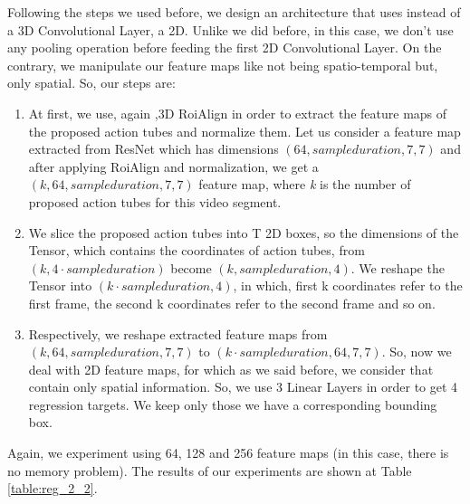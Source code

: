 \documentclass{report}
\begin{document}
Following the steps we used before, we design an architecture that uses instead of a 3D Convolutional Layer, a 2D. Unlike we did before, in this case, we don't
use any pooling operation before feeding the first 2D Convolutional Layer. On the contrary, we manipulate our feature maps like not being spatio-temporal but,
only spatial. So, our steps are:
\begin{enumerate}
\item At first, we use, again ,3D RoiAlign in order to extract the feature maps of the proposed action tubes and normalize them. Let us consider a feature map
  extracted from ResNet which has dimensions $(64,sample duration,7,7)$ and after applying RoiAlign and normalization, we get a $(k,64,sample duration,7,7)$ feature map,
  where \textit{k} is the number of proposed  action tubes for this video segment.
\item We slice the proposed action tubes into T 2D boxes, so the dimensions of the Tensor, which contains the coordinates of action tubes, from $(k,4\cdot sample duration)$
  become $(k,sample duration, 4)$. We reshape the Tensor into $(k\cdot sample duration, 4)$, in which, first k coordinates refer to the first frame, the
  second k coordinates refer to the second frame and so on.
\item Respectively, we reshape extracted feature maps from $(k, 64, sample duration, 7, 7)$ to $(k\cdot sample duration, 64, 7, 7)$. So, now we deal with 2D feature maps, for which as we said before,
  we consider that contain only spatial information. So, we use 3 Linear Layers in order to get 4 regression targets. We keep only those we have a corresponding bounding
  box.
\end{enumerate}

Again, we experiment using 64, 128 and 256 feature maps (in this case, there is no memory problem). The results of our experiments are shown at Table \ref{table:reg_2_2}.
\end{document}
